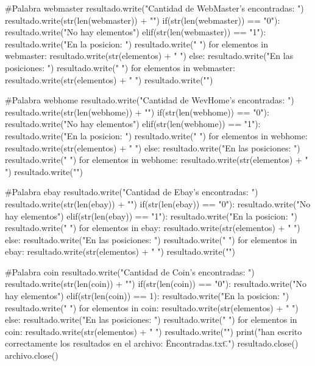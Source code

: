 \documentclass{article}
\begin{document}
\begin{python}
			#Palabra webmaster    
			resultado.write("Cantidad de WebMaster's encontradas: ")
			resultado.write(str(len(webmaster)) + "\n")
			if(str(len(webmaster)) == "0"):
				resultado.write("No hay elementos")
			elif(str(len(webmaster)) == "1"):
				resultado.write("En la posicion: ")
				resultado.write(" ") 
				for elementos in webmaster:
					resultado.write(str(elementos) + " ") 
			else:  
				resultado.write("En las posiciones: ")
				resultado.write(" ") 
				for elementos in webmaster:
					resultado.write(str(elementos) + " ")     
			resultado.write("\n\n")
			
			#Palabra webhome
			resultado.write("Cantidad de WevHome's encontradas: ")
			resultado.write(str(len(webhome)) + "\n")
			if(str(len(webhome)) == "0"):
				resultado.write("No hay elementos")
			elif(str(len(webhome)) == "1"):
				resultado.write("En la posicion: ")
				resultado.write(" ") 
				for elementos in webhome:
					resultado.write(str(elementos) + " ") 
			else:  
				resultado.write("En las posiciones: ")
				resultado.write(" ") 
				for elementos in webhome:
					resultado.write(str(elementos) + " ")     
			resultado.write("\n\n")
		
			#Palabra ebay
			resultado.write("Cantidad de Ebay's encontradas: ")
			resultado.write(str(len(ebay)) + "\n")
			if(str(len(ebay)) == "0"):
				resultado.write("No hay elementos")
			elif(str(len(ebay)) == "1"):
				resultado.write("En la posicion: ")
				resultado.write(" ") 
				for elementos in ebay:
					resultado.write(str(elementos) + " ") 
			else:  
				resultado.write("En las posiciones: ")
				resultado.write(" ") 
				for elementos in ebay:
					resultado.write(str(elementos) + " ")     
			resultado.write("\n\n")
			
			#Palabra coin
			resultado.write("Cantidad de Coin's encontradas: ")
			resultado.write(str(len(coin)) + "\n")
			if(str(len(coin)) == "0"):
				resultado.write("No hay elementos")
			elif(str(len(coin)) == 1):
				resultado.write("En la posicion: ")
				resultado.write(" ") 
				for elementos in coin:
					resultado.write(str(elementos) + " ") 
			else:  
				resultado.write("En las posiciones: ")
				resultado.write(" ") 
				for elementos in coin:
					resultado.write(str(elementos) + " ")     
			resultado.write("\n\n")    
			print("\nSe han escrito correctamente los resultados en el archivo: \"Encontradas.txt\".")    
			resultado.close()
			archivo.close()
			

\end{python}
\end{document}
